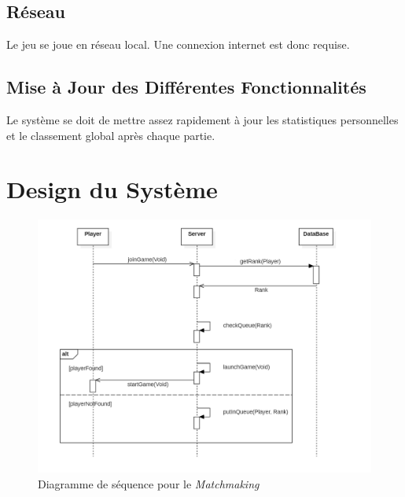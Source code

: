 \documentclass[10pt, a4paper]{article}
\begin{document}
\subsection{Réseau}
Le jeu se joue en réseau local. Une connexion internet est donc requise. \\

\subsection{Mise à Jour des Différentes Fonctionnalités}
Le système se doit de mettre assez rapidement à jour les statistiques personnelles et le classement global après chaque partie.

\section{Design du Système}

\begin{figure}[ht]
\centering
\includegraphics[scale=0.72]{SequenceDiagramMatchmaking.png}
\caption{Diagramme de séquence pour le \textit{Matchmaking}}
\label{SD_matchmaker} %
\end{figure}
\end{document}
